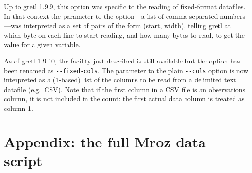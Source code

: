 Up to gretl 1.9.9, this option was specific to the reading of
fixed-format datafiles. In that context the parameter to the
option---a list of comma-separated numbers---was interpreted as a set
of pairs of the form (start, width), telling gretl at which byte on
each line to start reading, and how many bytes to read, to get the
value for a given variable.

As of gretl 1.9.10, the facility just described is still available but
the option has been renamed as \verb|--fixed-cols|. The parameter to
the plain \verb|--cols| option is now interpreted as a (1-based) list
of the columns to be read from a delimited text datafile (e.g.\
CSV). Note that if the first column in a CSV file is an observations
column, it is not included in the count: the first actual data column
is treated as column 1.

\section*{Appendix: the full Mroz data script}

